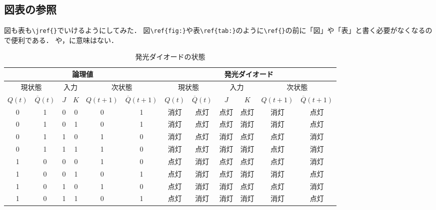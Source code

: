 \subsection{図表の参照}
図も表も\verb*|\jref{}|でいけるようにしてみた．
図\verb*|\ref{fig:}|や表\verb*|\ref{tab:}|のように\verb*|\ref{}|の前に「図」や「表」と書く必要がなくなるので便利である．
や，に意味はない．

\begin{table}[tbp]
  \caption{発光ダイオードの状態}
  \label{tab:diode}
  \centering
  \small
  \begin{tabular}{|cc|cc|cc|cc|cc|cc|}
    \hline
    \multicolumn{6}{|c|}{論理値} & \multicolumn{6}{|c|}{発光ダイオード} \\
    \hline
    \multicolumn{2}{|c|}{現状態} & \multicolumn{2}{|c|}{入力} & \multicolumn{2}{|c|}{次状態} & \multicolumn{2}{|c|}{現状態} & \multicolumn{2}{|c|}{入力} & \multicolumn{2}{|c|}{次状態} \\
    $Q(t)$ & $\overline{Q}(t)$ & $J$ & $K$ & $Q(t+1)$ & $\overline{Q}(t+1)$ & $Q(t)$ & $\overline{Q}(t)$ & $J$ & $K$ & $Q(t+1)$ & $\overline{Q}(t+1)$ \\
    \hline
    0 & 1 & 0 & 0 & 0 & 1 & 消灯 & 点灯 & 点灯 & 点灯 & 消灯 & 点灯 \\
    0 & 1 & 0 & 1 & 0 & 1 & 消灯 & 点灯 & 点灯 & 消灯 & 消灯 & 点灯 \\
    0 & 1 & 1 & 0 & 1 & 0 & 消灯 & 点灯 & 消灯 & 点灯 & 点灯 & 消灯 \\
    0 & 1 & 1 & 1 & 1 & 0 & 消灯 & 点灯 & 消灯 & 消灯 & 点灯 & 消灯 \\
    \hline
    1 & 0 & 0 & 0 & 1 & 0 & 点灯 & 消灯 & 点灯 & 点灯 & 点灯 & 消灯 \\
    1 & 0 & 0 & 1 & 0 & 1 & 点灯 & 消灯 & 点灯 & 消灯 & 消灯 & 点灯 \\
    1 & 0 & 1 & 0 & 1 & 0 & 点灯 & 消灯 & 消灯 & 点灯 & 点灯 & 消灯 \\
    1 & 0 & 1 & 1 & 0 & 1 & 点灯 & 消灯 & 消灯 & 消灯 & 消灯 & 点灯 \\
    \hline
  \end{tabular}
\end{table}

